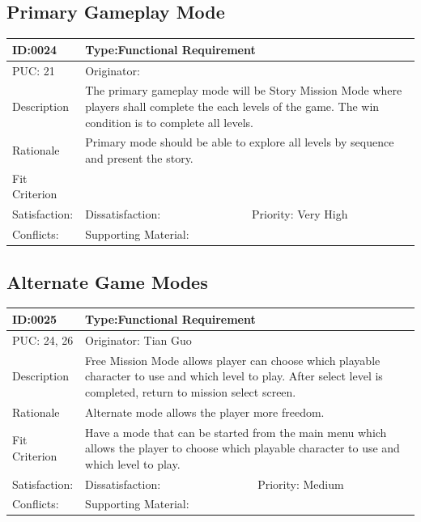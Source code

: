 \documentclass{article}
\begin{document}
	\subsection{Primary Gameplay Mode}


	\begin{table}[H]
		\begin{tabular}{|l|l|l|}
			\hline
			ID:0024 & \multicolumn{2}{l|}{Type:Functional Requirement} \\ \hline
			PUC: 21 & \multicolumn{2}{l|}{Originator:} \\ \hline
			Description & \multicolumn{2}{m{0.85\textwidth}|}{The primary gameplay mode will be Story Mission Mode where players shall complete the each levels of the game. The win condition is to complete all levels.} \\ \hline
			Rationale & \multicolumn{2}{m{0.85\textwidth}|}{Primary mode should be able to explore all levels by sequence and present the story.} \\ \hline
			Fit Criterion & \multicolumn{2}{m{0.85\textwidth}|}{} \\ \hline
			Satisfaction: & Dissatisfaction: & Priority: Very High\\ \hline
			Conflicts: & \multicolumn{2}{l|}{Supporting Material:} \\ \hline
		\end{tabular}
	\end{table}

	\subsection{Alternate Game Modes}


	\begin{table}[H]
		\begin{tabular}{|l|l|l|}
			\hline
			ID:0025 & \multicolumn{2}{l|}{Type:Functional Requirement} \\ \hline
			PUC: 24, 26 & \multicolumn{2}{l|}{Originator: Tian Guo} \\ \hline
			Description & \multicolumn{2}{m{0.85\textwidth}|}{Free Mission Mode allows player can choose which playable character to use and which level to play. After select level is completed, return to mission select screen.} \\ \hline
			Rationale & \multicolumn{2}{m{0.85\textwidth}|}{Alternate mode allows the player more freedom.} \\ \hline
			Fit Criterion & \multicolumn{2}{m{0.85\textwidth}|}{Have a mode that can be started from the main menu which allows the player to choose which playable character to use and which level to play. } \\ \hline
			Satisfaction: & Dissatisfaction: & Priority: Medium\\ \hline
			Conflicts: & \multicolumn{2}{l|}{Supporting Material:} \\ \hline
		\end{tabular}
	\end{table}
\end{document}
